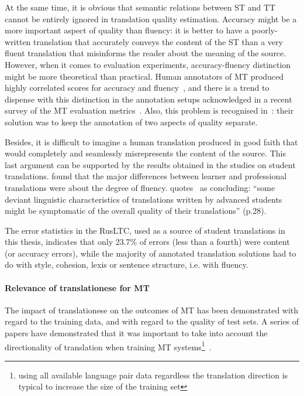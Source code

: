 At the same time, it is obvious that semantic relations between ST and TT cannot be entirely ignored in translation quality estimation. Accuracy might be a more important aspect of quality than fluency: it is better to have a poorly-written translation that accurately conveys the content of the ST than a very fluent translation that misinforms the reader about the meaning of the source. 
However, when it comes to evaluation experiments, accuracy-fluency distinction might be more theoretical than practical. Human annotators of MT produced highly correlated scores for accuracy and fluency~\cite{CallisonBurch2007}, and there is a trend to dispense with this distinction in the annotation setups acknowledged in a recent survey of the MT evaluation metrics~\cite{Chatzikoumi2020}. Also, this problem is recognised in~\citet{Daems2017}: their solution was to keep the annotation of two aspects of quality separate.

Besides, it is difficult to imagine a human translation produced in good faith that would completely and seamlessly misrepresents the content of the source. This last argument can be supported by the results obtained in the studies on student translations. \citet{Carl2010} found that the major differences between learner and professional translations were about the degree of fluency. \citet{Sutter2017} quotes~\citet{Loock2016} as concluding: ``some deviant linguistic characteristics of translations written by advanced students might be symptomatic of the overall quality of their translations'' (p.28). 

The error statistics in the \gls{RusLTC}, used as a source of student translations in this thesis, indicates that only 23.7\% of errors (less than a fourth) were content (or accuracy errors), while the majority of annotated translation solutions had to do with style, cohesion, lexis or sentence structure, i.e. with fluency. 
\paragraph{Relevance of translationese for MT} The impact of translationese on the outcomes of MT has been demonstrated with regard to the training data, and with regard to the quality of test sets. 
A series of papers have demonstrated that it was important to take into account the directionality of translation when training MT systems\footnote{using all available language pair data regardless the translation direction is typical to increase the size of the training set}~\cite{Kurokawa2009,Lembersky2012,Lembersky2013,Stymne2017}.

